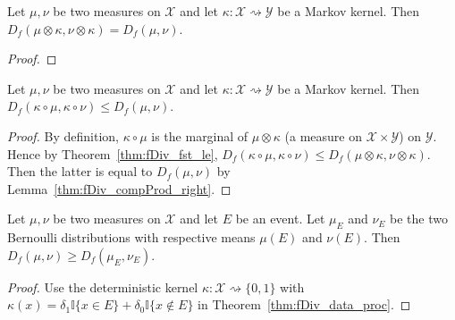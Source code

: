 \begin{lemma}
  \label{thm:fDiv_compProd_right}
  Let $\mu, \nu$ be two measures on $\mathcal X$ and let $\kappa : \mathcal X \rightsquigarrow \mathcal Y$ be a Markov kernel.
  Then $D_f(\mu \otimes \kappa, \nu \otimes \kappa) = D_f(\mu, \nu)$.
\end{lemma}

\begin{proof}
\end{proof}

\begin{theorem}
  \label{thm:fDiv_data_proc}
  Let $\mu, \nu$ be two measures on $\mathcal X$ and let $\kappa : \mathcal X \rightsquigarrow \mathcal Y$ be a Markov kernel.
  Then $D_f(\kappa \circ \mu, \kappa \circ \nu) \le D_f(\mu, \nu)$.
\end{theorem}

\begin{proof}
By definition, $\kappa \circ \mu$ is the marginal of $\mu \otimes \kappa$ (a measure on $\mathcal X \times \mathcal Y$) on $\mathcal Y$. Hence by Theorem~\ref{thm:fDiv_fst_le}, $D_f(\kappa \circ \mu, \kappa \circ \nu) \le D_f(\mu \otimes \kappa, \nu \otimes \kappa)$. Then the latter is equal to $D_f(\mu, \nu)$ by Lemma~\ref{thm:fDiv_compProd_right}.
\end{proof}

\begin{corollary}
  \label{cor:data_proc_event}
  Let $\mu, \nu$ be two measures on $\mathcal X$ and let $E$ be an event. Let $\mu_E$ and $\nu_E$ be the two Bernoulli distributions with respective means $\mu(E)$ and $\nu(E)$. Then $D_f(\mu, \nu) \ge D_f(\mu_E, \nu_E)$.
\end{corollary}

\begin{proof}
Use the deterministic kernel $\kappa : \mathcal X \rightsquigarrow \{0, 1\}$ with $\kappa(x) = \delta_1 \mathbb{I}\{x \in E\} + \delta_0 \mathbb{I}\{x \notin E\}$ in Theorem~\ref{thm:fDiv_data_proc}.
\end{proof}